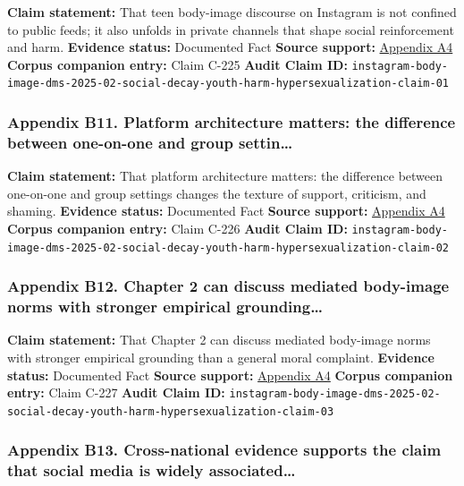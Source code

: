\documentclass[
  american,
  11pt,
  letterpaper,
]{article}
\begin{document}
\textbf{Claim statement:} That teen body-image discourse on Instagram is
not confined to public feeds; it also unfolds in private channels that
shape social reinforcement and harm. \textbf{Evidence status:}
Documented Fact \textbf{Source support:}
\hyperref[appendix-a4-unfiltered-how-teens-engage-in-body-image-and-shaming-discussions-via-instagram-direct-messages-dms]{Appendix
A4} \textbf{Corpus companion entry:} Claim C-225 \textbf{Audit Claim
ID:}
\texttt{instagram-body-image-dms-2025-02-social-decay-youth-harm-hypersexualization-claim-01}

\subsubsection{Appendix B11. Platform architecture matters: the
difference between one-on-one and group
settin\ldots{}}\label{appendix-b11-platform-architecture-matters-the-difference-between-one-on-one-and-group-settin}

\textbf{Claim statement:} That platform architecture matters: the
difference between one-on-one and group settings changes the texture of
support, criticism, and shaming. \textbf{Evidence status:} Documented
Fact \textbf{Source support:}
\hyperref[appendix-a4-unfiltered-how-teens-engage-in-body-image-and-shaming-discussions-via-instagram-direct-messages-dms]{Appendix
A4} \textbf{Corpus companion entry:} Claim C-226 \textbf{Audit Claim
ID:}
\texttt{instagram-body-image-dms-2025-02-social-decay-youth-harm-hypersexualization-claim-02}

\subsubsection{Appendix B12. Chapter 2 can discuss mediated body-image
norms with stronger empirical
grounding\ldots{}}\label{appendix-b12-chapter-2-can-discuss-mediated-body-image-norms-with-stronger-empirical-grounding}

\textbf{Claim statement:} That Chapter 2 can discuss mediated body-image
norms with stronger empirical grounding than a general moral complaint.
\textbf{Evidence status:} Documented Fact \textbf{Source support:}
\hyperref[appendix-a4-unfiltered-how-teens-engage-in-body-image-and-shaming-discussions-via-instagram-direct-messages-dms]{Appendix
A4} \textbf{Corpus companion entry:} Claim C-227 \textbf{Audit Claim
ID:}
\texttt{instagram-body-image-dms-2025-02-social-decay-youth-harm-hypersexualization-claim-03}

\subsubsection{Appendix B13. Cross-national evidence supports the claim
that social media is widely
associated\ldots{}}\label{appendix-b13-cross-national-evidence-supports-the-claim-that-social-media-is-widely-associated}
\end{document}

